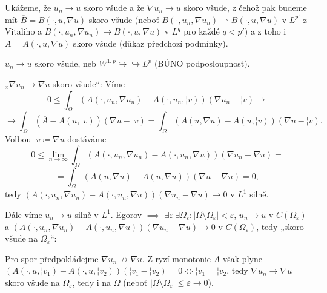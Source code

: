\documentclass[12pt]{article}					%
\begin{document}
\begin{lemma}
	\begin{dukazin}
		Ukážeme, že $u_n \rightarrow u$ skoro všude a že $\nabla u_n \rightarrow u$ skoro všude, z čehož pak budeme mít $\overline{B} = B(·, u, \nabla u)$ skoro všude (neboť $B(·, u_n, \nabla u_n) \rightharpoonup B(·, u, \nabla u)$ v $L^{p'}$ z Vitaliho a $B(·, u_n, \nabla u_n) \rightarrow B(·, u, \nabla u)$ v $L^q$ pro každé $q < p'$) a z toho i $\overline{A} = A(·, u, \nabla u)$ skoro všude (důkaz předchozí podmínky).

		$u_n \rightarrow u$ skoro všude, neb $W^{1, p} \hookrightarrow\hookrightarrow L^p$ (BÚNO podposloupnost).

		„$\nabla u_n \rightarrow \nabla u$ skoro všude“: Víme
		$$ 0 ≤ \int_Ω (A(·, u_n, \nabla u_n) - A(·, u_n, ¦v))(\nabla u_n - ¦v) \rightarrow $$
		$$ \rightarrow \int_Ω (\overline{A} - A(u, ¦v))(\nabla u - ¦v) = \int_Ω (A(u, \nabla u) - A(u, ¦v))(\nabla u - ¦v). $$
		Volbou $¦v \coloneq \nabla u$ dostáváme
		$$ 0 ≤ \lim_{n \rightarrow ∞} \int_Ω (A(·, u_n, \nabla u_n) - A(·, u_n, \nabla u))(\nabla u_n - \nabla u) = $$
		$$ = \int_Ω (A(u, \nabla u) - A(u, \nabla u))(\nabla u - \nabla u) = 0, $$
		tedy $(A(·, u_n, \nabla u_n) - A(·, u_n, \nabla u))(\nabla u_n - \nabla u) \rightarrow 0$ v $L^1$ silně.

		Dále víme $u_n \rightarrow u$ silně v $L^1$. Egorov $\implies$ $\exists ε\ \exists Ω_ε: |Ω \setminus Ω_ε| < ε$, $u_n \rightarrow u$ v $C(Ω_ε)$ a $(A(·, u_n, \nabla u_n) - A(·, u_n, \nabla u))(\nabla u_n - \nabla u) \rightarrow 0$ v $C(Ω_ε)$, tedy „skoro všude na $Ω_ε$“:

		Pro spor předpokládejme $\nabla u_n \nrightarrow \nabla u$. Z ryzí monotonie $A$ však plyne $(A(·, u, ¦v_1) - A(·, u, ¦v_2))(¦v_1 - ¦v_2) = 0 \Leftrightarrow ¦v_1 = ¦v_2$, tedy $\nabla u_n \rightarrow \nabla u$ skoro všude na $Ω_ε$, tedy i na $Ω$ (neboť $|Ω \setminus Ω_ε| ≤ ε \rightarrow 0$).
	\end{dukazin}
\end{lemma}
\end{document}
